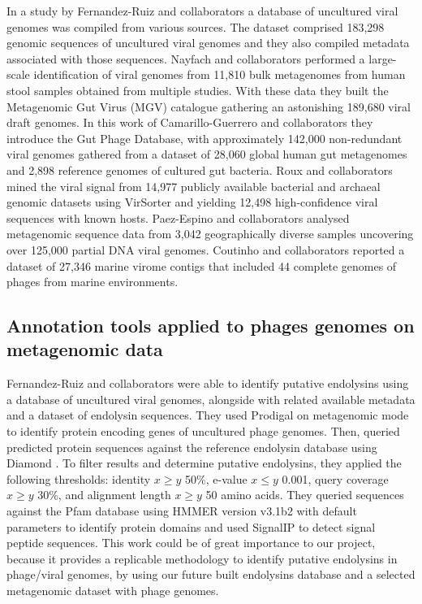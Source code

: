 \documentclass[runningheads]{llncs}
\begin{document}
In a study by Fernandez-Ruiz and collaborators \cite{Fernandez-Ruiz2018} a database of uncultured viral genomes was compiled from various sources. The dataset comprised 183,298 genomic sequences of uncultured viral genomes and they also compiled metadata associated with those sequences. Nayfach and collaborators \cite{Nayfach2021} performed a large-scale identification
of viral genomes from 11,810 bulk metagenomes from human stool
samples obtained from multiple studies. With these data they built the Metagenomic Gut Virus (MGV) catalogue gathering an astonishing 189,680 viral draft genomes. In this work of Camarillo-Guerrero and collaborators \cite{Camarillo-Guerrero2021} they introduce the Gut Phage Database, with approximately 142,000 non-redundant viral genomes gathered from a dataset of 28,060 global human gut metagenomes and 2,898 reference genomes of cultured gut bacteria. Roux and collaborators \cite{Roux2015} mined the viral signal from 14,977 publicly available bacterial and archaeal genomic datasets using VirSorter and yielding 12,498 high-confidence viral sequences with known hosts. Paez-Espino and collaborators \cite{Paez-Espino2016} analysed metagenomic sequence data from 3,042 geographically diverse samples uncovering over 125,000 partial DNA viral genomes. Coutinho and collaborators \cite{Coutinho2017} reported a dataset of 27,346 marine virome contigs that included 44 complete genomes of phages from marine environments. 
%
\subsection{Annotation tools applied to phages genomes on metagenomic data}
Fernandez-Ruiz and collaborators \cite{Fernandez-Ruiz2018} were able to identify putative endolysins using a database of uncultured viral genomes, alongside with related available metadata and a dataset of endolysin sequences. They used Prodigal \cite{Hyatt2010} on metagenomic mode to identify protein encoding genes of uncultured phage
genomes. Then, queried predicted protein sequences against the reference endolysin database using Diamond \cite{Buchfink2015}. To filter results and determine putative endolysins, they applied the following thresholds: identity $x \geq y$ 50\%, e-value $x \leq y$ 0.001, query coverage $x \geq y$ 30\%, and alignment length $x \geq y$ 50 amino
acids. They queried sequences against the Pfam database using HMMER version v3.1b2 \cite{Finn2015} with default parameters to identify protein domains and used SignalIP \cite{Petersen2011} to detect signal peptide sequences. 
This work could be of great importance to our project, because it provides a replicable methodology to identify putative endolysins in phage/viral genomes, by using our future built endolysins database and 
a selected metagenomic dataset with phage genomes. 
\end{document}
